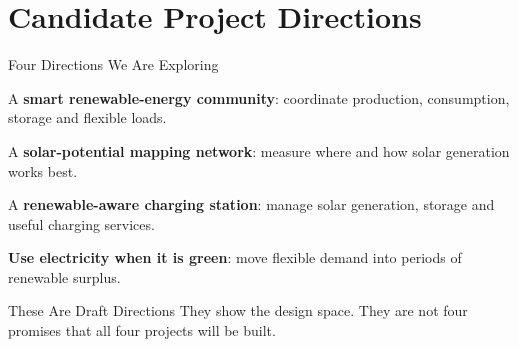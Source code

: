 \part[nopartpage]{Candidate Project Directions}

\begin{frame}{Four Directions We Are Exploring}
\begin{description}[SolarScout]
    \item[GreenShare] A \textbf{smart renewable-energy community}: coordinate production, consumption, storage and flexible loads.
    \item[SolarScout] A \textbf{solar-potential mapping network}: measure where and how solar generation works best.
    \item[SunCharge] A \textbf{renewable-aware charging station}: manage solar generation, storage and useful charging services.
    \item[EnergyFlex] \textbf{Use electricity when it is green}: move flexible demand into periods of renewable surplus.
\end{description}
\begin{alertblock}{These Are Draft Directions}
They show the design space. They are not four promises that all four projects will be built.
\end{alertblock}
\end{frame}
